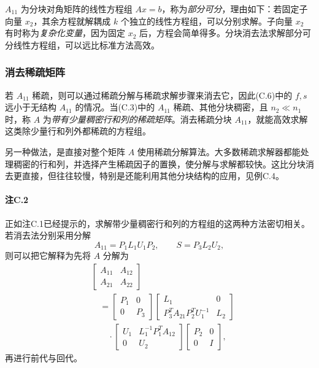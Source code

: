 $A_{11}$ 为分块对角矩阵的线性方程组 $Ax=b$，称为\emph{部分可分}，理由如下：若固定子向量 $x_2$，其余方程就解耦成 $k$ 个独立的线性方程组，可以分别求解。子向量 $x_2$ 有时称为\emph{复杂化变量}，因为固定 $x_2$ 后，方程会简单得多。分块消去法求解部分可分线性方程组，可以远比标准方法高效。

\subsubsection*{消去稀疏矩阵}
若 $A_{11}$ 稀疏，则可以通过稀疏分解与稀疏求解步骤来消去它，因此(C.6)中的 $f,s$ 远小于无结构 $A_{11}$ 的情况。当(C.3)中的 $A_{11}$ 稀疏、其他分块稠密，且 $n_2\ll n_1$ 时，称 $A$ 为\emph{带有少量稠密行和列的稀疏矩阵}。消去稀疏分块 $A_{11}$，就能高效求解这类除少量行和列外都稀疏的方程组。

另一种做法，是直接对整个矩阵 $A$ 使用稀疏分解算法。大多数稀疏求解器都能处理稠密的行和列，并选择产生稀疏因子的置换，使分解与求解都较快。这比分块消去更直接，但往往较慢，特别是还能利用其他分块结构的应用，见例C.4。

\paragraph{注C.2}
正如注C.1已经提示的，求解带少量稠密行和列的方程组的这两种方法密切相关。若消去法分别采用分解
\[
 A_{11}=P_1L_1U_1P_2,\qquad S=P_3L_2U_2,
\]
则可以把它解释为先将 $A$ 分解为
\begin{align*}
 &\begin{bmatrix}A_{11}&A_{12}\\A_{21}&A_{22}\end{bmatrix}\\
 &\quad=\begin{bmatrix}P_1&0\\0&P_3\end{bmatrix}
 \begin{bmatrix}L_1&0\\P_3^TA_{21}P_2^TU_1^{-1}&L_2\end{bmatrix}\\
 &\qquad\cdot\begin{bmatrix}U_1&L_1^{-1}P_1^TA_{12}\\0&U_2\end{bmatrix}
 \begin{bmatrix}P_2&0\\0&I\end{bmatrix},
\end{align*}
再进行前代与回代。


